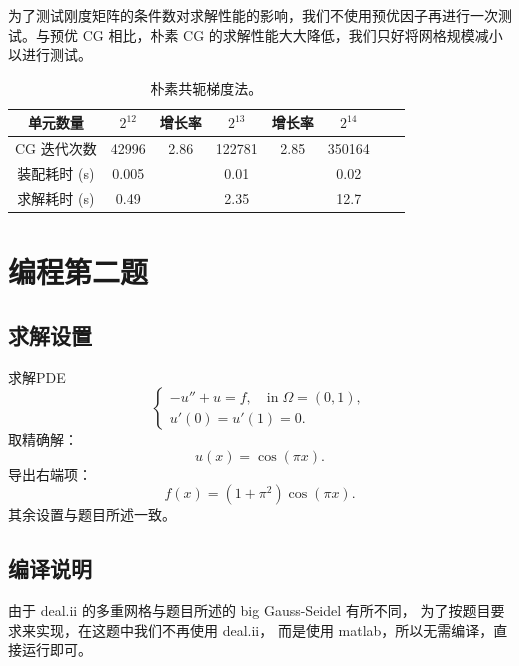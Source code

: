 \documentclass[lang=cn,11pt,a4paper]{elegantpaper}
\begin{document}
为了测试刚度矩阵的条件数对求解性能的影响，我们不使用预优因子再进行一次测试。与预优 CG 相比，朴素 CG 的求解性能大大降低，我们只好将网格规模减小以进行测试。

\begin{table}[H]
    \centering
    \begin{tabular}{|c|c|c|c|c|c|c|c|}
    \hline
    单元数量                    & $2^{12}$ & 增长率 & $2^{13}$ & 增长率 & $2^{14}$ \\ \hline
    CG 迭代次数            & 42996 & 2.86 & 122781 & 2.85 & 350164\\    
\hline
    装配耗时 (s)           & 0.005          &      & 0.01           &      & 0.02     \\ \hline
    求解耗时 (s)           & 0.49          &      & 2.35           &      & 12.7     \\ \hline
    \end{tabular}
    \caption{\small 朴素共轭梯度法。}
\end{table}

\section{编程第二题}

\subsection{求解设置}

求解PDE
\begin{equation}
    \left\{
        \begin{array}{l}
            -u'' + u = f,\quad \text{in}\;\Omega=(0,1),\\
            u'(0) = u'(1) = 0.
        \end{array}
    \right.
\end{equation}
取精确解：
\begin{equation}
    u(x)=\cos(\pi x).
\end{equation}
导出右端项：
\begin{equation}
    f(x)=(1+\pi^2)\cos(\pi x).
\end{equation}
其余设置与题目所述一致。

\subsection{编译说明}

由于 deal.ii 的多重网格与题目所述的 big Gauss-Seidel 有所不同，
为了按题目要求来实现，在这题中我们不再使用 deal.ii，
而是使用 matlab，所以无需编译，直接运行即可。

\appendix
\addappheadtotoc
\end{document}
